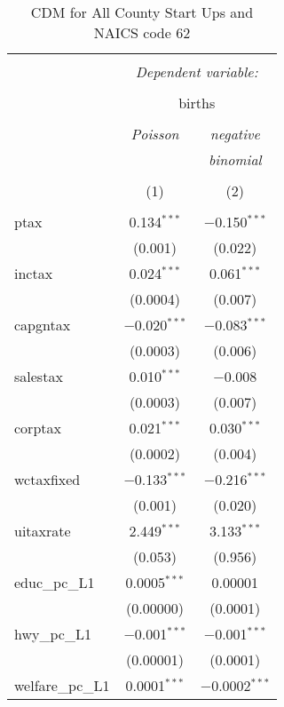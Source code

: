 
\begin{table}[!htbp] \centering 
  \caption{CDM for All County Start Ups and NAICS code 62} 
  \label{} 
\begin{tabular}{@{\extracolsep{5pt}}lcc} 
\\[-1.8ex]\hline 
\hline \\[-1.8ex] 
 & \multicolumn{2}{c}{\textit{Dependent variable:}} \\ 
\cline{2-3} 
\\[-1.8ex] & \multicolumn{2}{c}{births} \\ 
\\[-1.8ex] & \textit{Poisson} & \textit{negative} \\ 
 & \textit{} & \textit{binomial} \\ 
\\[-1.8ex] & (1) & (2)\\ 
\hline \\[-1.8ex] 
 ptax & 0.134$^{***}$ & $-$0.150$^{***}$ \\ 
  & (0.001) & (0.022) \\ 
  inctax & 0.024$^{***}$ & 0.061$^{***}$ \\ 
  & (0.0004) & (0.007) \\ 
  capgntax & $-$0.020$^{***}$ & $-$0.083$^{***}$ \\ 
  & (0.0003) & (0.006) \\ 
  salestax & 0.010$^{***}$ & $-$0.008 \\ 
  & (0.0003) & (0.007) \\ 
  corptax & 0.021$^{***}$ & 0.030$^{***}$ \\ 
  & (0.0002) & (0.004) \\ 
  wctaxfixed & $-$0.133$^{***}$ & $-$0.216$^{***}$ \\ 
  & (0.001) & (0.020) \\ 
  uitaxrate & 2.449$^{***}$ & 3.133$^{***}$ \\ 
  & (0.053) & (0.956) \\ 
  educ\_pc\_L1 & 0.0005$^{***}$ & 0.00001 \\ 
  & (0.00000) & (0.0001) \\ 
  hwy\_pc\_L1 & $-$0.001$^{***}$ & $-$0.001$^{***}$ \\ 
  & (0.00001) & (0.0001) \\ 
  welfare\_pc\_L1 & 0.0001$^{***}$ & $-$0.0002$^{***}$ \\ 

\end{tabular}
\end{table}
